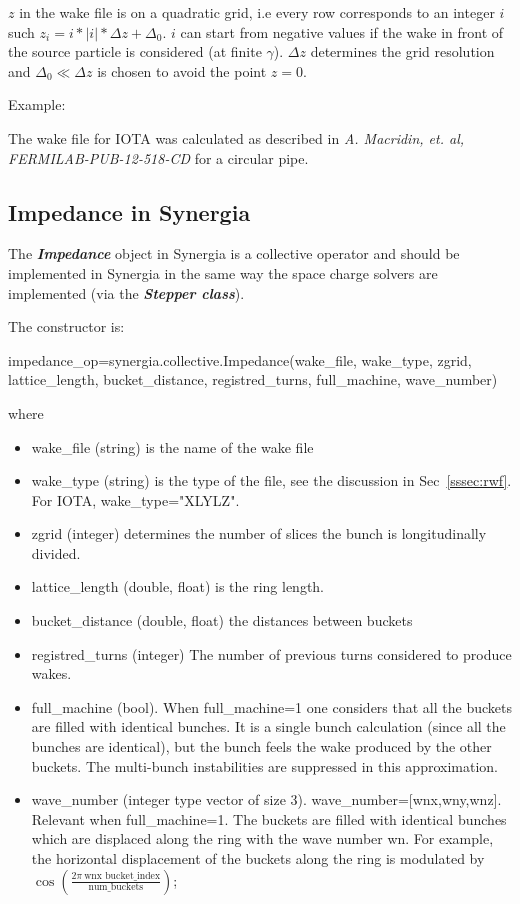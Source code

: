 \documentclass[preprint]{revtex4}
\begin{document}
$z$ in the wake file is  on a quadratic grid, i.e every row corresponds to an integer $i$
such  $z_i=i*|i|*\Delta z+\Delta_0$. $i$ can start from negative values if the wake in front of the source particle is 
considered (at finite $\gamma$). $\Delta z$ determines the grid resolution and $\Delta_0 \ll \Delta z$ is chosen to avoid 
the point $z=0$.

Example:

The wake file for IOTA was calculated as described in {\em A. Macridin, et. al,  FERMILAB-PUB-12-518-CD}
for a circular pipe.

\subsection{Impedance in Synergia}

The {\bf \em Impedance} object in Synergia is a collective operator and should be implemented 
in Synergia in  the same way the space charge solvers are implemented (via the  {\bf \em Stepper class}).

\noindent The constructor is:

\noindent impedance\_op=synergia.collective.Impedance(wake\_file, wake\_type, zgrid, lattice\_length, bucket\_distance, registred\_turns, full\_machine, wave\_number)

\noindent where

\begin{itemize}

\item wake\_file (string) is the name of the wake file  
\item wake\_type (string) is the type of the file, see the discussion  in Sec~\ref{sssec:rwf}. For IOTA, wake\_type="XLYLZ".
\item zgrid (integer) determines the number of slices the bunch is longitudinally divided.
\item lattice\_length (double, float) is the ring length.
\item  bucket\_distance (double, float) the distances between buckets
\item  registred\_turns (integer) The number of previous turns considered to produce wakes.  
\item full\_machine (bool).  When full\_machine=1 one considers that all the buckets are filled with identical bunches.
It is a single bunch calculation (since all the bunches are identical), but the bunch feels the wake 
produced by the other buckets. The multi-bunch instabilities are suppressed in this approximation.
\item wave\_number (integer type vector of size 3). wave\_number=[wnx,wny,wnz]. Relevant when full\_machine=1. The buckets are filled with
identical bunches which are displaced along the ring with the wave number wn. For example, the horizontal displacement of 
the buckets along the ring is modulated by $\cos\left(\frac{2 \pi ~\text{wnx bucket\_index}}{\text{num\_buckets}}\right)$;

\end{itemize}
\end{document}
